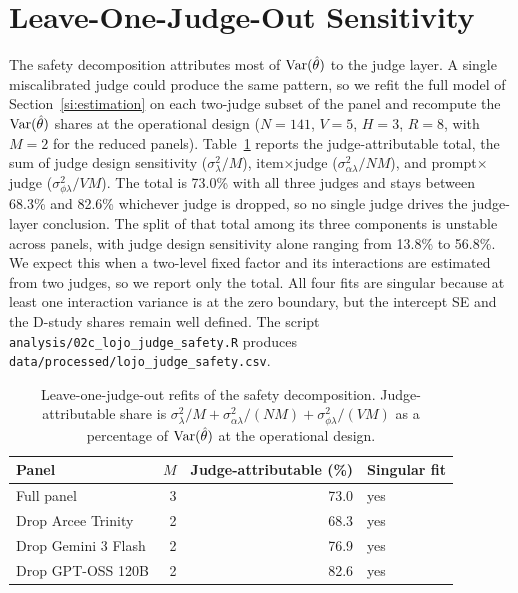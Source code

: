 \clearpage

\section{Leave-One-Judge-Out Sensitivity}
\label{si:lojo}

The safety decomposition attributes most of $\operatorname{Var}(\hat\theta)$ to the judge layer. A single miscalibrated judge could produce the same pattern, so we refit the full model of Section~\ref{si:estimation} on each two-judge subset of the panel and recompute the $\operatorname{Var}(\hat\theta)$ shares at the operational design ($N{=}141$, $V{=}5$, $H{=}3$, $R{=}8$, with $M{=}2$ for the reduced panels). Table~\ref{tab:lojo} reports the judge-attributable total, the sum of judge design sensitivity ($\sigma^2_\lambda/M$), item$\times$judge ($\sigma^2_{\alpha\lambda}/NM$), and prompt$\times$judge ($\sigma^2_{\phi\lambda}/VM$). The total is 73.0\% with all three judges and stays between 68.3\% and 82.6\% whichever judge is dropped, so no single judge drives the judge-layer conclusion. The split of that total among its three components is unstable across panels, with judge design sensitivity alone ranging from 13.8\% to 56.8\%. We expect this when a two-level fixed factor and its interactions are estimated from two judges, so we report only the total. All four fits are singular because at least one interaction variance is at the zero boundary, but the intercept SE and the D-study shares remain well defined. The script \texttt{analysis/02c\_lojo\_judge\_safety.R} produces \texttt{data/processed/lojo\_judge\_safety.csv}.

\begin{table}[ht]
\centering
\small
\caption{Leave-one-judge-out refits of the safety decomposition. Judge-attributable share is $\sigma^2_\lambda/M + \sigma^2_{\alpha\lambda}/(NM) + \sigma^2_{\phi\lambda}/(VM)$ as a percentage of $\operatorname{Var}(\hat\theta)$ at the operational design.}
\label{tab:lojo}
\begin{tabular}{lrrl}
\toprule
\textbf{Panel} & $M$ & \textbf{Judge-attributable (\%)} & \textbf{Singular fit} \\
\midrule
Full panel          & 3 & 73.0 & yes \\
Drop Arcee Trinity  & 2 & 68.3 & yes \\
Drop Gemini 3 Flash & 2 & 76.9 & yes \\
Drop GPT-OSS 120B   & 2 & 82.6 & yes \\
\bottomrule
\end{tabular}
\end{table}

